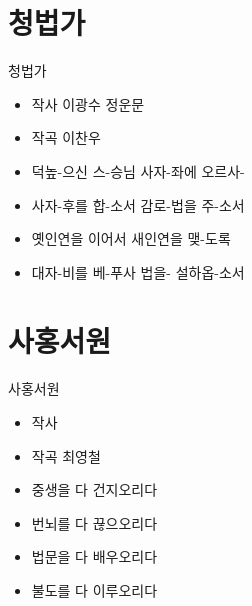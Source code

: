 \documentclass[aspectratio=1610,17pt,xcolor=pdftex,dvipsnames,table,handout]{beamer}
\begin{document}
		\section{ 청법가 }
		

		\begin{frame} [t,plain]
			\begin{block} { 청법가 }

			\setlength{\leftmargini}{2em}			
			\begin{itemize}
				\item 작사  이광수 정운문
				\item 작곡  이찬우

				\item 덕높-으신 스-승님 사자-좌에 오르사-
				\item    사자-후를 합-소서 감로-법을 주-소서
				\item    옛인연을 이어서 새인연을 맺-도록
				\item    대자-비를 베-푸사 법을- 설하옵-소서
			\end{itemize}
			
			\end{block}
		\end{frame} 	%




		\section{ 사홍서원 }
		

		\begin{frame} [t,plain]
			\begin{block} { 사홍서원 }

			\setlength{\leftmargini}{2em}			
			\begin{itemize}
				\item 작사
				\item 작곡  최영철

				\item   중생을 다 건지오리다
				\item    번뇌를 다 끊으오리다
				\item    법문을 다 배우오리다
				\item    불도를 다 이루오리다
			\end{itemize}
			
			\end{block}
		\end{frame} 	%
\end{document}
